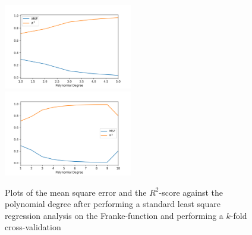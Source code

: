 \documentclass[a4paper,10pt,english]{article}
\begin{document}
\begin{figure}[H]
	\centering 
	\includegraphics[width = 0.5\textwidth, center]{../franke_output/part_B.png}
	\includegraphics[width = 0.5\textwidth, center]{../franke_output/part_B_highdeg.png}
	\caption{
		Plots of the mean square error and the $R^2$-score against the polynomial degree after performing a standard least square regression analysis on the Franke-function and performing a $k$-fold cross-validation
	}
	\label{part_b}
\end{figure}
\end{document}
